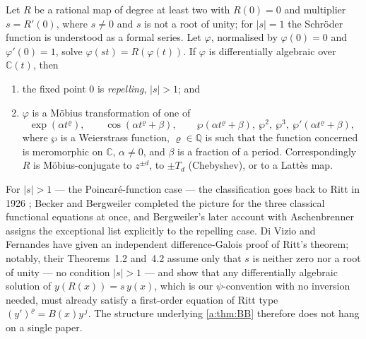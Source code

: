 \begin{theorem}
\label{a:thm:BB}
Let $R$ be a rational map of degree at least two with $R(0)=0$ and multiplier
$s = R'(0)$, where $s\neq0$ and $s$ is not a root of unity; for $|s|=1$ the
Schröder function is understood as a formal series. Let $\varphi$, normalised by
$\varphi(0)=0$ and $\varphi'(0)=1$, solve $\varphi(st) = R(\varphi(t))$. If
$\varphi$ is differentially algebraic over $\mathbb C(t)$, then
\begin{enumerate}[label=\textup{(\roman*)}]
\item the fixed point $0$ is \emph{repelling}, $|s|>1$; and
\item $\varphi$ is a Möbius transformation of one of
\begin{equation*}
\exp(\alpha t^{\varrho}),
\qquad
\cos(\alpha t^{\varrho}+\beta),
\qquad
\wp(\alpha t^{\varrho}+\beta),\ \wp^{2},\ \wp^{3},\ \wp'(\alpha t^{\varrho}+\beta),
\end{equation*}
where $\wp$ is a Weierstrass function, $\varrho\in\mathbb Q$ is such that the
function concerned is meromorphic on $\mathbb C$, $\alpha\neq0$, and $\beta$ is a
fraction of a period. Correspondingly $R$ is Möbius-conjugate to $z^{\pm d}$, to
$\pm T_d$ (Chebyshev), or to a Lattès map.
\end{enumerate}
\end{theorem}

\begin{remark}
\label{a:rem:lineage}
For $|s|>1$ --- the Poincaré-function case --- the classification goes back to Ritt
in 1926 \cite{Ritt1926}; Becker and Bergweiler completed the picture for the three
classical functional equations at once, and Bergweiler's later account with
Aschenbrenner \cite{AschenbrennerBergweiler2015} assigns the exceptional list
explicitly to the repelling case. Di Vizio and Fernandes
\cite{DiVizioFernandes2021} have given an independent difference-Galois proof of
Ritt's theorem; notably, their Theorems~1.2 and~4.2 assume only that $s$ is neither
zero nor a root of unity --- no condition $|s|>1$ --- and show that any
differentially algebraic solution of $y(R(x)) = s\,y(x)$, which is our
$\psi$-convention with no inversion needed, must already satisfy a first-order
equation of Ritt type $(y')^{\varrho} = B(x)y^{\,j}$. The structure underlying
\cref{a:thm:BB} therefore does not hang on a single paper.
\end{remark}

